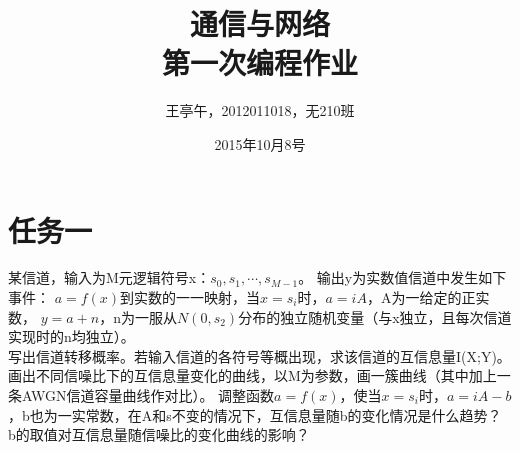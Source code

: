 \documentclass{article}
\begin{document}
\title{通信与网络\\第一次编程作业}
\author{王亭午，2012011018，无210班}
\date{2015年10月8号}
\maketitle
\section{任务一}
某信道，输入为M元逻辑符号x：\(s_0,s_1,\cdots,s_{M-1}\)。
输出y为实数值信道中发生如下事件：
\(a=f(x)\)到实数的一一映射，当\(x=s_i\)时，\(a=iA\)，A为一给定的正实数，
\(y=a+n\)，n为一服从\(N(0,s_2)\)分布的独立随机变量（与x独立，且每次信道实现时的n均独立）。\\
写出信道转移概率。若输入信道的各符号等概出现，求该信道的互信息量I(X;Y)。画出不同信噪比下的互信息量变化的曲线，以M为参数，画一簇曲线（其中加上一条AWGN信道容量曲线作对比）。
调整函数\(a=f(x)\)，使当\(x=s_i\)时，\(a=iA-b\)，b也为一实常数，在A和s不变的情况下，互信息量随b的变化情况是什么趋势？
b的取值对互信息量随信噪比的变化曲线的影响？
\end{document}
